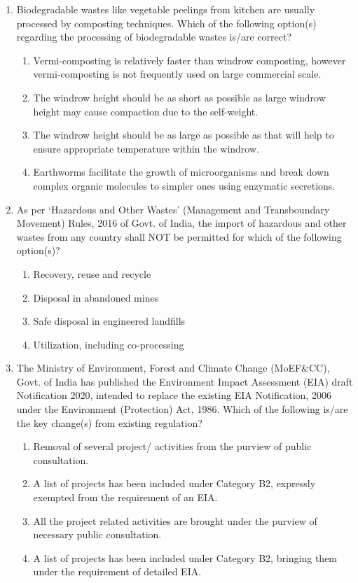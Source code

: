 \documentclass[12pt,a4paper]{article}
\begin{document}
\begin{enumerate}
   \item Biodegradable wastes like vegetable peelings from kitchen are usually processed by composting techniques. Which of the following option(s) regarding the processing of biodegradable wastes is/are correct?
         \begin{enumerate}
            \item Vermi-composting is relatively faster than windrow composting, however vermi-composting is not frequently used on large commercial scale.
            \item The windrow height should be as short as possible as large windrow height may cause compaction due to the self-weight.
            \item The windrow height should be as large as possible as that will help to ensure appropriate temperature within the windrow.
            \item Earthworms facilitate the growth of microorganisms and break down complex organic molecules to simpler ones using enzymatic secretions.
         \end{enumerate}

   \item As per `Hazardous and Other Wastes' (Management and Transboundary Movement) Rules, 2016 of Govt. of India, the import of hazardous and other wastes from any country shall NOT be permitted for which of the following option(s)?
         \begin{enumerate}
            \item Recovery, reuse and recycle
            \item Disposal in abandoned mines
            \item Safe disposal in engineered landfills
            \item Utilization, including co-processing
         \end{enumerate}

   \item The Ministry of Environment, Forest and Climate Change (MoEF\&CC), Govt. of India has published the Environment Impact Assessment (EIA) draft Notification 2020, intended to replace the existing EIA Notification, 2006 under the Environment (Protection) Act, 1986. Which of the following is/are the key change(s) from existing regulation?
         \begin{enumerate}
            \item Removal of several project/ activities from the purview of public consultation.
            \item A list of projects has been included under Category B2, expressly exempted from the requirement of an EIA.
            \item All the project related activities are brought under the purview of necessary public consultation.
            \item A list of projects has been included under Category B2, bringing them under the requirement of detailed EIA.
         \end{enumerate}


\end{enumerate}
\end{document}

